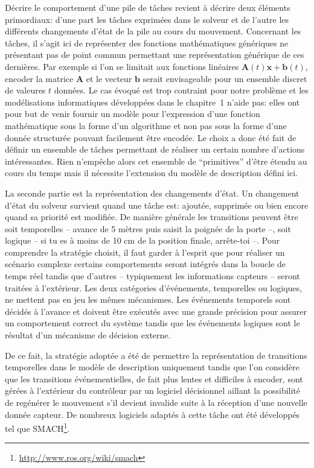 Décrire le comportement d'une pile de tâches revient à décrire deux
éléments primordiaux: d'une part les tâches exprimées dans le solveur
et de l'autre les différents changements d'état de la pile au cours du
mouvement. Concernant les tâches, il s'agit ici de représenter des
fonctions mathématiques génériques ne présentant pas de point commun
permettant une représentation générique de ces dernières. Par exemple
si l'on se limitait aux fonctions linéaires $\mathbf{A}(t) \mathbf{x}
+ \mathbf{b}(t)$, encoder la matrice $\mathbf{A}$ et le vecteur
$\mathbf{b}$ serait envisageable pour un ensemble discret de valeures
$t$ données. Le cas évoqué est trop contraint pour notre problème et
les modélisations informatiques développées dans le chapitre 1 n'aide
pas: elles ont pour but de venir fournir un modèle pour l'expression
d'une fonction mathématique sous la forme d'un algorithme et non pas
sous la forme d'une donnée structurée pouvant facilement être encodée.
Le choix a donc été fait de définir un ensemble de tâches permettant
de réaliser un certain nombre d'actions intéressantes. Rien n'empêche
alors cet ensemble de ``primitives'' d'être étendu au cours du temps
mais il nécessite l'extension du modèle de description défini ici.


La seconde partie est la représentation des changements d'état. Un
changement d'état du solveur survient quand une tâche est: ajoutée,
supprimée ou bien encore quand sa priorité est modifiée. De manière
générale les transitions peuvent être soit temporelles -- avance de 5
mètres puis saisit la poignée de la porte --, soit logique -- si tu es
à moins de 10 cm de la position finale, arrête-toi --. Pour
comprendre la stratégie choisit, il faut garder à l'esprit que pour
réaliser un scénario complexe certains comportements seront intégrés
dans la boucle de temps réel tandis que d'autres -- typiquement les
informations capteurs -- seront traitées à l'extérieur. Les deux
catégories d'événements, temporelles ou logiques, ne mettent pas en
jeu les mêmes mécanismes. Les événements temporels sont décidés à
l'avance et doivent être exécutés avec une grande précision pour
assurer un comportement correct du système tandis que les événements
logiques sont le résultat d'un mécanisme de décision externe.

De ce fait, la stratégie adoptée a été de permettre la représentation
de transitions temporelles dans le modèle de description uniquement
tandis que l'on considère que les transitions événementielles, de fait
plus lentes et difficiles à encoder, sont gérées à l'extérieur du
contrôleur par un logiciel décisionnel aillant la possibilité de
regénérer le mouvement s'il devient invalide suite à la réception
d'une nouvelle donnée capteur. De nombreux logiciels adaptés à cette
tâche ont été développés tel que
SMACH\footnote{\url{http://www.ros.org/wiki/smach}}.


